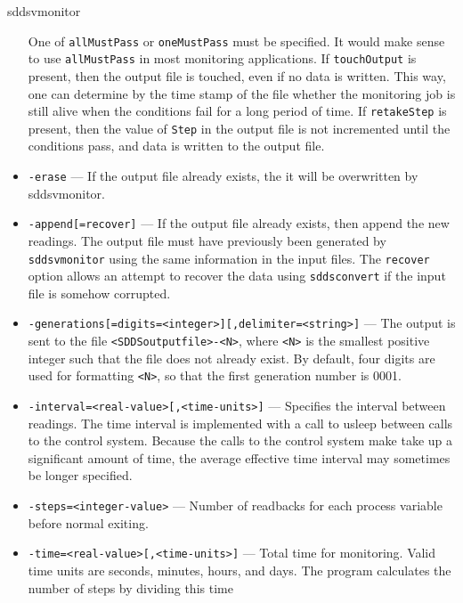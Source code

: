 \begin{sddsprog}{sddsvmonitor}
\begin{itemize}
                One of \verb+allMustPass+ or \verb+oneMustPass+ must be specified. It would make sense
                to use \verb+allMustPass+ in most monitoring applications.
                If \verb+touchOutput+ is present, then the output file is touched, even if no data
                is written. This way, one can determine by the time stamp of the file
                whether the monitoring job is still alive
                when the conditions fail for a long period of time. If \verb+retakeStep+ is
                present, then the value of \verb+Step+ in the output file is not
                incremented until the conditions pass, and data is written to the output file.

  \item {\tt -erase} --- If the output file already exists, the it will be overwritten
                by sddsvmonitor.
  \item {\tt -append[=recover]} --- If the output file already exists, then append the new readings.
                The output file must have previously been generated by \verb+sddsvmonitor+ using the same
                information in the input files.
                The {\verb+recover+} option allows an attempt
                to recover the data using \verb+sddsconvert+ if the input file is somehow corrupted.
  \item {\verb+-generations[=digits=<integer>][,delimiter=<string>]+} ---
                The output is sent to the file \verb+<SDDSoutputfile>-<N>+, where \verb+<N>+ is
                   the smallest positive integer such that the file does not already
                   exist.   By default, four digits are used for formatting \verb+<N>+, so that
                   the first generation number is 0001.
  \item {\tt -interval=<real-value>[,<time-units>]} --- Specifies the interval between readings. The time
                interval is implemented with a call to usleep between calls to the control system.
                Because the calls to the control system make take up a significant amount of time, the average
                effective time interval may sometimes be longer specified.
  \item {\tt -steps=<integer-value>} --- Number of readbacks for each process variable before normal exiting.
  \item {\tt -time=<real-value>[,<time-units>]} --- Total time for monitoring. Valid time units are
                seconds, minutes, hours, and days. The program calculates the number of steps by dividing this time

\end{itemize}
\end{sddsprog}
